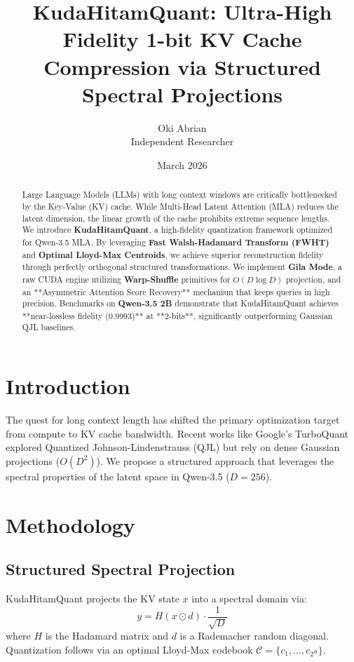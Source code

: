 \documentclass[twocolumn]{article}
\title{\textbf{KudaHitamQuant: Ultra-High Fidelity 1-bit KV Cache Compression via Structured Spectral Projections}}
\author{Oki Abrian \\ \small{Independent Researcher}}
\date{March 2026}
\begin{document}
\maketitle

\begin{abstract}
Large Language Models (LLMs) with long context windows are critically bottlenecked by the Key-Value (KV) cache. While Multi-Head Latent Attention (MLA) reduces the latent dimension, the linear growth of the cache prohibits extreme sequence lengths. We introduce \textbf{KudaHitamQuant}, a high-fidelity quantization framework optimized for Qwen-3.5 MLA. By leveraging \textbf{Fast Walsh-Hadamard Transform (FWHT)} and \textbf{Optimal Lloyd-Max Centroids}, we achieve superior reconstruction fidelity through perfectly orthogonal structured transformations. We implement \textbf{Gila Mode}, a raw CUDA engine utilizing \textbf{Warp-Shuffle} primitives for $O(D \log D)$ projection, and an **Asymmetric Attention Score Recovery** mechanism that keeps queries in high precision. Benchmarks on \textbf{Qwen-3.5 2B} demonstrate that KudaHitamQuant achieves **near-lossless fidelity (0.9993)** at **2-bits**, significantly outperforming Gaussian QJL baselines.
\end{abstract}

\section{Introduction}
The quest for long context length has shifted the primary optimization target from compute to KV cache bandwidth. Recent works like Google's TurboQuant explored Quantized Johnson-Lindenstrauss (QJL) but rely on dense Gaussian projections ($O(D^2)$). We propose a structured approach that leverages the spectral properties of the latent space in Qwen-3.5 ($D=256$).

\section{Methodology}
\subsection{Structured Spectral Projection}
KudaHitamQuant projects the KV state $x$ into a spectral domain via:
\begin{equation}
y = H(x \odot d) \cdot \frac{1}{\sqrt{D}}
\end{equation}
where $H$ is the Hadamard matrix and $d$ is a Rademacher random diagonal. Quantization follows via an optimal Lloyd-Max codebook $\mathcal{C} = \{c_1, \dots, c_{2^B}\}$.
\end{document}
